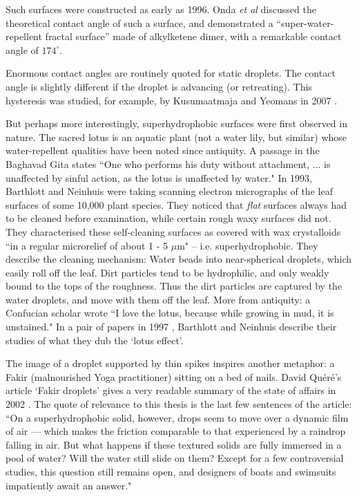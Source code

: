 \documentclass[12pt, a4paper, twoside, openright]{book}
\begin{document}
Such surfaces were constructed as early as 1996.  Onda \emph{et al} \cite{Onda1996} discussed the theoretical contact angle of such a surface, and demonstrated a ``super-water-repellent fractal surface'' made of alkylketene dimer, with a remarkable contact angle of $174^{\circ}$.

Enormous contact angles are routinely quoted for static droplets.  The contact angle is slightly different if the droplet is advancing (or retreating).  This hysteresis was studied, for example, by Kusumaatmaja and Yeomans in 2007 \cite{KusumaatmajaYeomans2007}.

\clearpage
But perhaps more interestingly, superhydrophobic surfaces were first observed in nature. The sacred lotus is an aquatic plant (not a water lily, but similar) whose water-repellent qualities have been noted since antiquity.  A passage in the Baghavad Gita states ``One who performs his duty without attachment, ... is unaffected by sinful action, as the lotus is unaffected by water."
In 1993, Barthlott and Neinhuis were taking scanning electron micrographs of the leaf surfaces of some 10,000 plant species.  They noticed that \emph{flat} surfaces always had to be cleaned before examination, while certain rough waxy surfaces did not.  They characterised these self-cleaning surfaces as covered with wax crystalloids ``in a regular microrelief of about 1 - 5 $\mu$m" -- i.e. superhydrophobic.  They describe the cleaning mechanism: Water beads into near-spherical droplets, which easily roll off the leaf.  Dirt particles tend to be hydrophilic, and only weakly bound to the tops of the roughness.  Thus the dirt particles are captured by the water droplets, and move with them off the leaf.  More from antiquity: a Confucian scholar wrote ``I love the lotus, because while growing in mud, it is unstained." In a pair of papers in 1997 \cite{BarthlottNeinhuis1997,NeinhuisBarthlott1997}, Barthlott and Neinhuis describe their studies of what they dub the `lotus effect'.

The image of a droplet supported by thin spikes inspires another metaphor: a Fakir (malnourished Yoga practitioner) sitting on a bed of nails.  David Qu\'{e}r\'{e}'s article `Fakir droplets' gives a very readable summary of the state of affairs in 2002 \cite{Quere2002}.  The quote of relevance to this thesis is the last few sentences of the article: ``On a superhydrophobic solid, however, drops seem to move over a dynamic film of air --- which makes the friction comparable to that experienced by a raindrop falling in air.  But what happens if these textured solids are fully immersed in a pool of water? Will the water still slide on them?  Except for a few controversial studies, this question still remains open, and designers of boats and swimsuits impatiently await an answer."
\end{document}
